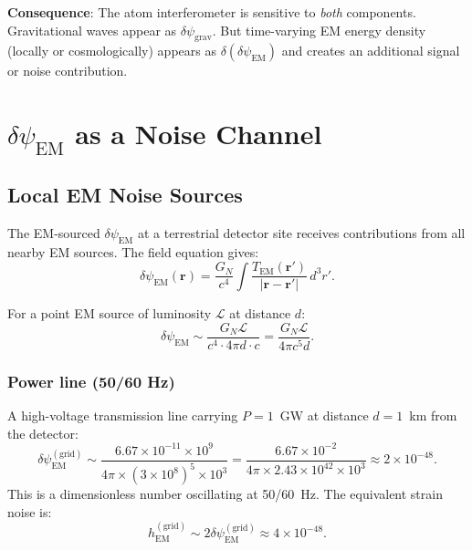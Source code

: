 \documentclass[11pt]{article}
\theoremstyle{definition}
\theoremstyle{remark}
\newcommand{\ee}[1]{\times10^{#1}}
\newcommand{\psigrav}{\psi_{\mathrm{grav}}}
\newcommand{\dpsiem}{\delta\psi_{\mathrm{EM}}}
\newcommand{\GN}{G_N}
\begin{document}
\textbf{Consequence}: The atom interferometer is sensitive to \emph{both}
components. Gravitational waves appear as $\delta\psigrav$. But
time-varying EM energy density (locally or cosmologically) appears as
$\delta(\dpsiem)$ and creates an additional signal or noise contribution.

\section{$\dpsiem$ as a Noise Channel}
\label{sec:P6-noise}

\subsection{Local EM Noise Sources}

The EM-sourced $\dpsiem$ at a terrestrial detector site receives
contributions from all nearby EM sources. The field equation gives:
\begin{equation}
\dpsiem(\mathbf{r}) = \frac{\GN}{c^4} \int
\frac{T_{\mathrm{EM}}(\mathbf{r}')}{|\mathbf{r} - \mathbf{r}'|}
\,d^3r'.
\label{eq:dpsiem-local}
\end{equation}

For a point EM source of luminosity $\mathcal{L}$ at distance $d$:
\begin{equation}
\dpsiem \sim \frac{\GN \mathcal{L}}{c^4 \cdot 4\pi d \cdot c}
= \frac{\GN \mathcal{L}}{4\pi c^5 d}.
\label{eq:dpsiem-point}
\end{equation}

\subsubsection{Power line (50/60 Hz)}
A high-voltage transmission line carrying $P = 1$~GW at distance
$d = 1$~km from the detector:
\begin{equation}
\dpsiem^{(\mathrm{grid})} \sim \frac{6.67\ee{-11} \times 10^9}
{4\pi \times (3\ee{8})^5 \times 10^3}
= \frac{6.67\ee{-2}}{4\pi \times 2.43\ee{42} \times 10^3}
\approx 2\ee{-48}.
\end{equation}
This is a dimensionless number oscillating at 50/60~Hz. The equivalent
strain noise is:
\begin{equation}
h_{\mathrm{EM}}^{(\mathrm{grid})} \sim 2\dpsiem^{(\mathrm{grid})}
\approx 4\ee{-48}.
\end{equation}
\end{document}
